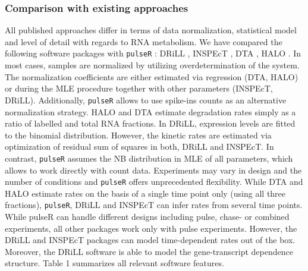 \subsubsection*{Comparison with existing approaches}
All published approaches differ in terms of 
data normalization, statistical model and level of detail with regards to 
RNA metabolism. We have compared the following software packages with \verb|pulseR| :
DRiLL \citep{rabani2014high},
INSPEcT \citep{de2015inspect},
DTA \citep{schwalb2012measurement},
HALO \citep{friedel2010halo}.
In most cases, samples are normalized by utilizing overdetermination of the system.
The normalization coefficients are either estimated via regression
(DTA, HALO) or during the MLE procedure together  
with other parameters (INSPEcT, DRiLL). 
Additionally, 
\verb|pulseR| allows to use spike-ins counts as an alternative normalization strategy.
HALO and DTA estimate degradation rates simply as  a ratio of labelled and
total RNA fractions.
In DRiLL, expression levels are fitted to the binomial distribution. 
However, the kinetic rates are estimated via optimization of residual sum of squares in both, DRiLL and 
INSPEcT.
In contrast, \verb|pulseR| assumes the NB distribution
in MLE of all parameters, which allows to work directly with count data.
Experiments may vary in design and the number of conditions and \verb|pulseR| offers unprecedented flexibility.
While DTA and HALO estimate rates on the basis of a single time point only (using all three fractions),
\verb|pulseR|, DRiLL and INSPEcT can infer rates from several time points.
While pulseR can handle different designs including pulse, chase- or combined 
experiments, all other packages work only with pulse experiments.
However, the DRiLL and INSPEcT packages can model 
time-dependent rates out of the box.
Moreover, the DRiLL software is able to model the gene-transcript dependence structure.
Table 1 summarizes all relevant software features.
